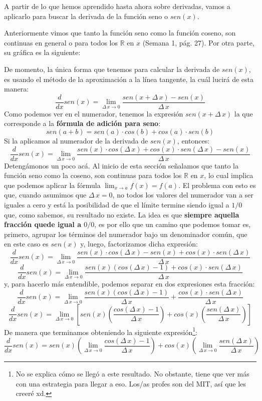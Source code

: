 \documentclass[12pt]{article}
\begin{document}
A partir de lo que hemos aprendido hasta ahora sobre derivadas, vamos a aplicarlo para buscar la derivada de la función seno o $sen(x)$.

Anteriormente vimos que tanto la función seno como la función coseno, son continuas en general o para todos los $\mathbb{R}$ en $x$ (Semana 1, pág. 27). Por otra parte, su gráfica es la siguiente:


De momento, la única forma que tenemos para calcular la derivada de $sen(x)$, es usando el método de la aproximación a la línea tangente, la cuál lucirá de esta manera:
\[\frac{d}{dx} sen(x) = \lim_{\Delta \, x \to 0} \frac{sen(x + \Delta \, x) - sen(x)}{\Delta \, x}\]
Como podemos ver en el numerador, tenemos la expresión $sen(x + \Delta \, x)$ la que corresponde a la \textbf{fórmula de adición para seno}:
\[sen(a + b) = sen(a) \cdot cos(b) + cos(a) \cdot sen(b)\]
Si la aplicamos al numerador de la derivada de $sen(x)$, entonces:
\[\frac{d}{dx} sen(x) = \lim_{\Delta \, x \to 0} \frac{sen(x) \cdot cos(\Delta \, x) + cos(x) \cdot sen(\Delta \, x) - sen(x)}{\Delta \, x}\]
Detengámonos un poco acá. Al inicio de esta sección señalamos que tanto la función seno como la coseno, son continuas para todos los $\mathbb{R}$ en $x$, lo cual implica que podemos aplicar la fórmula $\lim_{x \to a} f(x) = f(a)$. El problema con esto es que, cuando asumimos que $\Delta \, x = 0$, no todos los valores del numerador van a ser iguales a cero y está la posibilidad de que el límite termine siendo igual a $1/0$ que, como sabemos, su resultado no existe. La idea es que \textbf{siempre aquella fracción quede igual a $0/0$}, es por ello que un camino que podemos tomar es, primero, agrupar los términos del numerador bajo un denominador común, que en este caso es $sen(x)$ y, luego, factorizamos dicha expresión:
\[\frac{d}{dx} sen(x) = \lim_{\Delta \, x \to 0} \frac{sen(x) \cdot cos(\Delta \, x) - sen(x) + cos(x) \cdot sen(\Delta \, x)}{\Delta \, x}\]
\[\frac{d}{dx} sen(x) = \lim_{\Delta \, x \to 0} \frac{sen(x)(cos(\Delta \, x) - 1) + cos(x) \cdot sen(\Delta \, x)}{\Delta \, x}\]
y, para hacerlo más entendible, podemos separar en dos expresiones esta fracción:
\[\frac{d}{dx} sen(x) = \lim_{\Delta \, x \to 0} \frac{sen(x)(cos(\Delta \, x) - 1)}{\Delta \, x} + \frac{cos(x) \cdot sen(\Delta \, x)}{\Delta \, x}\]
\[\frac{d}{dx} sen(x) = \lim_{\Delta \, x \to 0} \left[sen(x) \left(\frac{cos(\Delta \, x) - 1}{\Delta \, x}\right) + cos(x)\left(\frac{sen(\Delta \, x)}{\Delta \, x}\right)\right]\]
De manera que terminamos obteniendo la siguiente expresión\footnote{No se explica cómo se llegó a este resultado. No obstante, tiene que ver más con una estrategia para llegar a eso. Los/as profes son del MIT, así que les creeré xd.}:
\[\frac{d}{dx} sen(x) = sen(x) \left(\lim_{\Delta \, x \to 0} \frac{cos(\Delta \, x) - 1}{\Delta \, x}\right) + cos(x)\left(\lim_{\Delta \, x \to 0} \frac{sen(\Delta \, x)}{\Delta \, x}\right)\]
\end{document}
